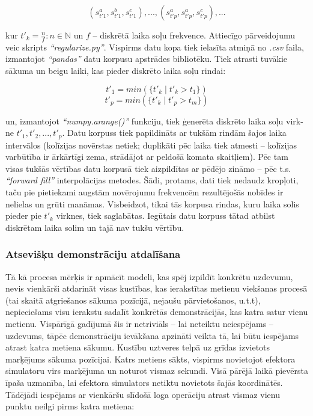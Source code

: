 \documentclass[12pt, a4paper]{article}
\numberwithin{equation}{section} %
\begin{document}
\begin{equation}
    (s^a_{t'1}, s^b_{t'1}, s^c_{t'1}), ..., (s^a_{t'p}, s^a_{t'p}, s^c_{t'p}), ...
\end{equation}

kur $t'_k = \frac{n}{f}: n \in \mathbb{N}$ un $f$ -- diskrētā laika soļu frekvence. Attiecīgo pārveidojumu veic skripts \textit{``regularize.py''}. Vispirms datu kopa tiek ielasīta atmiņā no \textit{.csv} faila, izmantojot \textit{``pandas''} datu korpusu apstrādes bibliotēku. Tiek atrasti tuvākie sākuma un beigu laiki, kas pieder diskrēto laika soļu rindai:

\begin{equation}
    t'_1 = min(\lbrace t'_k \mid t'_k > t_1 \rbrace)
\end{equation}
\begin{equation}
    t'_p = min(\lbrace t'_k \mid t'_p > t_m \rbrace)
\end{equation}

un, izmantojot \textit{``numpy.arange()''} funkciju, tiek ģenerēta diskrēto laika soļu virk-ne $t'_1, t'_2, ..., t'_p$. Datu korpuss tiek papildināts ar tukšām rindām šajos laika intervālos (kolīzijas novērstas netiek; duplikāti pēc laika tiek atmesti -- kolīzijas varbūtība ir ārkārtīgi zema, strādājot ar peldošā komata skaitļiem). Pēc tam visas tukšās vērtības datu korpusā tiek aizpildītas ar pēdējo zināmo -- pēc t.s. \textit{``forward fill''} interpolācijas metodes. Šādi, protams, dati tiek nedaudz kropļoti, taču pie pietiekami augstām novērojumu frekvencēm rezultējošās nobīdes ir nelielas un grūti manāmas. Visbeidzot, tikai tās korpusa rindas, kuru laika solis pieder pie $t'_k$ virknes, tiek saglabātas. Iegūtais datu korpuss tātad atbilst diskrētam laika solim un tajā nav tukšu vērtību.

\subsubsection{Atsevišķu demonstrāciju atdalīšana}

Tā kā procesa mērķis ir apmācīt modeli, kas spēj izpildīt konkrētu uzdevumu, nevis vienkārši atdarināt visas kustības, kas ierakstītas metienu viekšanas procesā (tai skaitā atgriešanos sākuma pozīcijā, nejaušu pārvietošanos, u.t.t), nepieciešams visu ierakstu sadalīt konkrētās demonstrācijās, kas katra satur vienu metienu. Vispārīgā gadījumā šis ir netriviāls -- lai neteiktu neiespējams -- uzdevums, tāpēc demonstrāciju ievākšana apzināti veikta tā, lai būtu iespējams atrast katra metiena sākumu. Kustību uztveres telpā uz grīdas izvietots marķējums sākuma pozīcijai. Katrs metiens sākts, vispirms novietojot efektora simulatoru virs marķējuma un noturot vismaz sekundi. Visā pārējā laikā pievērsta īpaša uzmanība, lai efektora simulators netiktu novietots šajās koordinātēs. Tādējādi iespējams ar vienkāršu slīdošā loga operāciju atrast vismaz vienu punktu neilgi pirms katra metiena:
\end{document}

